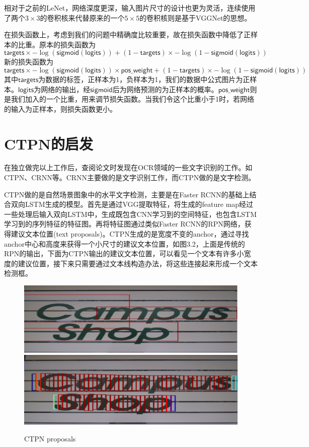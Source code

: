 相对于之前的LeNet，网络深度更深，输入图片尺寸的设计也更为灵活，连续使用了两个$3 \times 3$的卷积核来代替原来的一个$5 \times 5$的卷积核则是基于VGGNet的思想。

在损失函数上，考虑到我们的问题中精确度比较重要，故在损失函数中降低了正样本的比重。原本的损失函数为
\[\mathsf{targets} \times -\log(\mathsf{sigmoid}(\mathsf{logits})) + (1 - \mathsf{targets}) \times -\log(1 - \mathsf{sigmoid}(\mathsf{logits}))\]
新的损失函数为
\[\mathsf{targets} \times -\log(\mathsf{sigmoid}(\mathsf{logits})) \times \mathsf{pos\_weight} +(1 - \mathsf{targets}) \times -\log(1 - \mathsf{sigmoid}(\mathsf{logits}))\]
其中$\mathsf{targets}$为数据的标签，正样本为1，负样本为1，我们的数据中公式图片为正样本。$\mathsf{logits}$为网络的输出，经$\mathsf{sigmoid}$后为网络预测的为正样本的概率。$\mathsf{pos\_weight}$则是我们加入的一个比重，用来调节损失函数。当我们令这个比重小于1时，若网络的输入为正样本，则损失函数更小。

\section{CTPN的启发}
\noindent

在独立做完以上工作后，查阅论文时发现在OCR领域的一些文字识别的工作。如CTPN\cite{ctpn}、CRNN等。CRNN主要做的是文字识别工作，而CTPN做的是文字检测。

CTPN做的是自然场景图象中的水平文字检测，主要是在Faster RCNN的基础上结合双向LSTM生成的模型。首先是通过VGG提取特征，将生成的feature map经过一些处理后输入双向LSTM中，生成既包含CNN学习到的空间特征，也包含LSTM学习到的序列特征的特征图。再将特征图通过类似Faster RCNN的RPN网络，获得建议文本位置(text proposals)。CTPN生成的是宽度不变的anchor，通过寻找anchor中心和高度来获得一个小尺寸的建议文本位置，如图3.2，上面是传统的RPN的输出，下面为CTPN输出的建议文本位置，可以看见一个文本有许多小宽度的建议位置，接下来只需要通过文本线构造办法，将这些连接起来形成一个文本检测框。

\begin{figure}[hp]
    \centering
    \includegraphics[scale=0.5]{rpn.eps}
    \includegraphics[scale=0.5]{ctpn.eps}
    \caption{CTPN proposals}
    \label{fig:label}
\end{figure}

